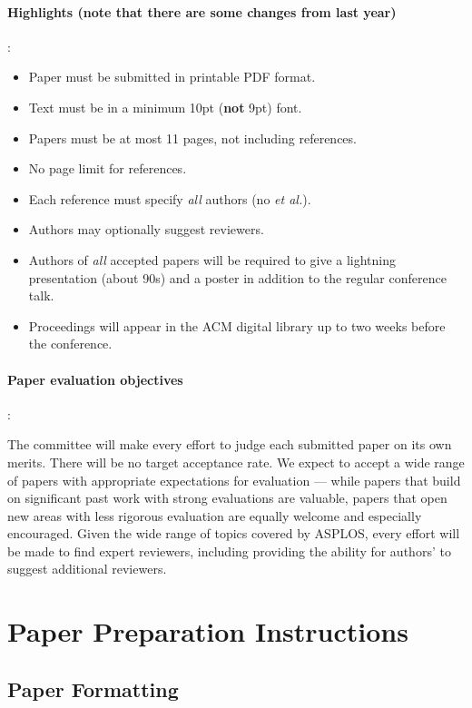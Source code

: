\documentclass[pageno]{jpaper}
\begin{document}
\paragraph{Highlights ({\bf note that there are some changes from last year})}: 
\begin{itemize} 
\item Paper must be submitted in printable PDF format.
\item Text must be in a minimum 10pt ({\bf not} 9pt) font.
\item Papers must be at most 11 pages, not including references. 
\item No page limit for references. 
\item Each reference must specify {\em all} authors (no {\em et al.}). 
\item Authors may optionally suggest reviewers. 
\item Authors of {\em all} accepted papers will be required to give a
lightning presentation (about 90s) and a poster in addition to the regular
conference talk.
\item Proceedings will appear in the ACM digital library up to two weeks
before the conference.
\end{itemize} 

\paragraph{Paper evaluation objectives}: 

The committee will make every effort to judge each submitted paper on
its own merits. There will be no target acceptance rate.  We expect to
accept a wide range of papers with appropriate expectations for
evaluation --- while papers that build on significant past work with
strong evaluations are valuable, papers that open new areas with less
rigorous evaluation are equally welcome and especially encouraged.
Given the wide range of topics covered by ASPLOS, every effort will be
made to find expert reviewers, including providing the ability for
authors' to suggest additional reviewers.

\section{Paper Preparation Instructions}

\subsection{Paper Formatting}
\end{document}
